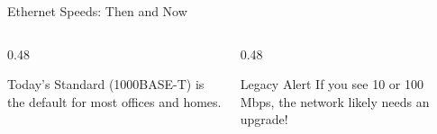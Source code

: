 \documentclass[aspectratio=169]{beamer}  %
\begin{document}
\begin{frame}{Ethernet Speeds: Then and Now}
    \vspace{0.3em}
    \begin{columns}[T]
        \begin{column}{0.48\textwidth}
            \begin{block}{Today's Standard}
                 (1000BASE-T) is the default for most offices and homes.
            \end{block}
        \end{column}
        \begin{column}{0.48\textwidth}
            \begin{alertblock}{Legacy Alert}
                If you see 10 or 100 Mbps, the network likely needs an upgrade!
            \end{alertblock}
        \end{column}
    \end{columns}
\end{frame}
\end{document}
